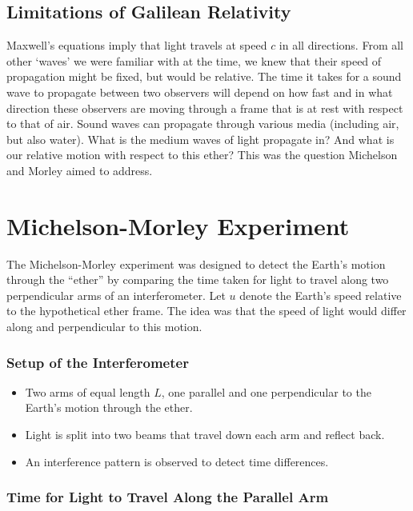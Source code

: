 \documentclass[12pt]{article}
\begin{document}
\subsection{Limitations of Galilean Relativity}
 Maxwell's equations imply that light travels at speed $c$ in all directions. From all other  `waves' we were familiar with at the time, we knew that their speed of propagation might be fixed, but would be relative. The time it takes for a sound wave to propagate between two observers will depend on how fast and in what direction these observers are moving through a frame that is at rest with respect to that of air. Sound waves can propagate through various media (including air, but also water). What is the medium waves of light propagate in? And what is our relative motion with respect to this ether? This was the question Michelson and Morley aimed to address. 

\section{Michelson-Morley Experiment}\label{sec:MM}

The Michelson-Morley experiment was designed to detect the Earth's motion through the ``ether'' by comparing the time taken for light to travel along two perpendicular arms of an interferometer. Let $u$ denote the Earth's speed relative to the hypothetical ether frame. The idea was that the speed of light would differ along and perpendicular to this motion.

\subsubsection{Setup of the Interferometer}
\begin{itemize}

\item Two arms of equal length $L$, one parallel and one perpendicular to the Earth's motion through the ether.
\item Light is split into two beams that travel down each arm and reflect back.
\item An interference pattern is observed to detect time differences.
\end{itemize}

\subsubsection{Time for Light to Travel Along the Parallel Arm}
\end{document}
